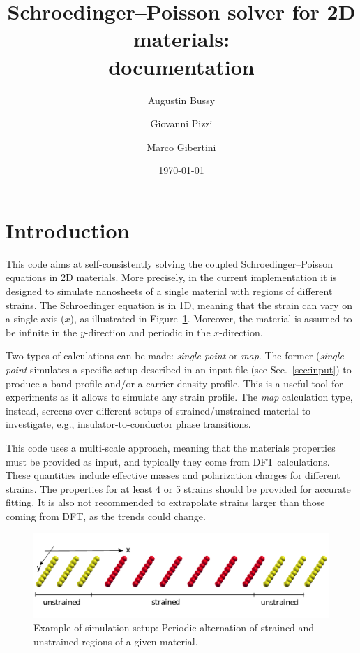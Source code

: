\documentclass[a4paper,12pt]{article}
\begin{document}
\title{Schroedinger--Poisson solver for 2D materials:\\documentation}
\date{\today}
\author{Augustin Bussy \and Giovanni Pizzi \and Marco Gibertini} 
\maketitle

\section{Introduction}

This code aims at self-consistently solving the coupled Schroedinger--Poisson equations in 2D materials. More precisely, in the current implementation it is designed to simulate nanosheets of a single material with regions of different strains. The Schroedinger equation is in 1D, meaning that the strain can vary on a single axis ($x$), as illustrated in Figure~\ref{fig:example1}. Moreover, the material is assumed to be infinite in the $y$-direction and periodic in the $x$-direction.

Two types of calculations can be made: \emph{single-point} or \emph{map}. The former (\emph{single-point} simulates a specific setup described in an input file (see Sec.~\ref{sec:input}) to produce a band profile and/or a carrier density profile. This is a useful tool for experiments as it allows to simulate any strain profile. The \emph{map} calculation type, instead, screens over different setups of strained/unstrained material to investigate, e.g., insulator-to-conductor phase transitions.

This code uses a multi-scale approach, meaning that the materials properties must be provided as input, and typically they come from DFT calculations. These quantities include effective masses and polarization charges for different strains. The properties for at least 4 or 5 strains should be provided for accurate fitting. It is also not recommended to extrapolate strains larger than those coming from DFT, as the trends could change.

\begin{figure} [h]
\begin{center}
\captionsetup{width=0.8\textwidth}
\centerline{\includegraphics[width=12cm,angle=0]{img/example1}}
\caption{Example of simulation setup: Periodic alternation of strained and unstrained regions of a given material.}
\label{fig:example1} 
\end{center}
\end{figure}
\end{document}
